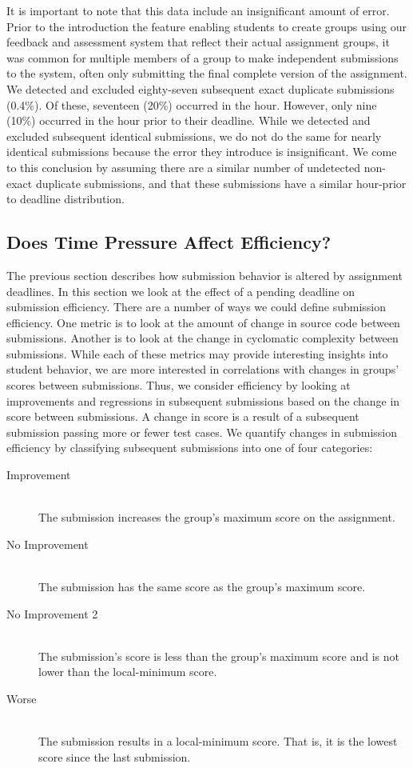It is important to note that this data include an insignificant amount of
error. Prior to the introduction the feature enabling students to create groups
using our feedback and assessment system that reflect their actual assignment
groups, it was common for multiple members of a group to make independent
submissions to the system, often only submitting the final complete version of
the assignment. We detected and excluded eighty-seven subsequent exact
duplicate submissions (0.4\%). Of these, seventeen (20\%) occurred in the
 hour. However, only nine (10\%) occurred in the hour prior to their
deadline. While we detected and excluded subsequent identical submissions, we
do not do the same for nearly identical submissions because the error they
introduce is insignificant. We come to this conclusion by assuming there are a
similar number of undetected non-exact duplicate submissions, and that these
submissions have a similar hour-prior to deadline distribution.

\subsection{Does Time Pressure Affect Efficiency?}

The previous section describes how submission behavior is altered by assignment
deadlines. In this section we look at the effect of a pending deadline on
submission efficiency. There are a number of ways we could define submission
efficiency. One metric is to look at the amount of change in source code
between submissions. Another is to look at the change in cyclomatic complexity
between submissions. While each of these metrics may provide interesting
insights into student behavior, we are more interested in correlations with
changes in groups' scores between submissions. Thus, we consider efficiency by
looking at improvements and regressions in subsequent submissions based on the
change in score between submissions. A change in score is a result of a
subsequent submission passing more or fewer test cases. We quantify changes in
submission efficiency by classifying subsequent submissions into one of four
categories:

\begin{description}
  \item[Improvement] \hfill \\ The submission increases the group's maximum
    score on the assignment.
  \item[No Improvement] \hfill \\ The submission has the same score as the
    group's maximum score.
  \item[No Improvement 2] \hfill \\ The submission's score is less than the
    group's maximum score and is not lower than the local-minimum score.
  \item[Worse] \hfill \\ The submission results in a local-minimum score. That
    is, it is the lowest score since the last \imp{} submission.
\end{description}

